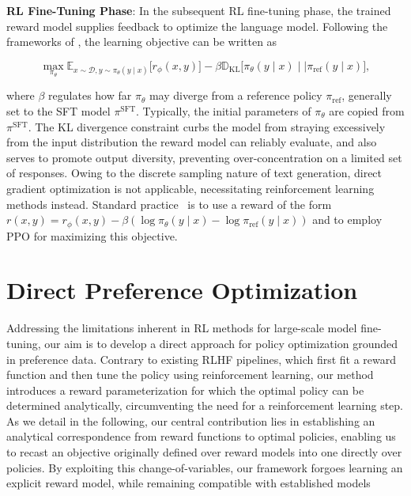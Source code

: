 \textbf{RL Fine-Tuning Phase}: In the subsequent RL fine-tuning phase, the trained reward model supplies feedback to optimize the language model. Following the frameworks of \citet{jaques2017sequence, jaques2020human}, the learning objective can be written as

\begin{equation}\label{eq:RL}
\max_{\pi_{\theta}}  \mathbb{E}_{x\sim \mathcal{D}, y\sim \pi_{\theta}(y \mid x)}\bigl[r_{\phi}(x, y)\bigr] - \beta\mathbb{D}_{\textrm{KL}}\bigl[\pi_{\theta}(y\mid x)\mid \mid \pi_\text{ref}(y\mid x)\bigr],
\end{equation}

where $\beta$ regulates how far $\pi_\theta$ may diverge from a reference policy $\pi_\text{ref}$, generally set to the SFT model $\pi^\text{SFT}$. Typically, the initial parameters of $\pi_\theta$ are copied from $\pi^\text{SFT}$. The KL divergence constraint curbs the model from straying excessively from the input distribution the reward model can reliably evaluate, and also serves to promote output diversity, preventing over-concentration on a limited set of responses. Owing to the discrete sampling nature of text generation, direct gradient optimization is not applicable, necessitating reinforcement learning methods instead. Standard practice~\cite{ziegler2020finetuning, stiennon2022learning, bai2022training, ouyang2022training} is to use a reward of the form ${r(x, y) = r_{\phi}(x, y) -\beta (\log \pi_{\theta}(y\mid x) - \log \pi_\text{ref}(y\mid x))}$ and to employ PPO \cite{schulman2017proximal} for maximizing this objective.

\section{Direct Preference Optimization}\label{sec:DPO}

Addressing the limitations inherent in RL methods for large-scale model fine-tuning, our aim is to develop a direct approach for policy optimization grounded in preference data. Contrary to existing RLHF pipelines, which first fit a reward function and then tune the policy using reinforcement learning, our method introduces a reward parameterization for which the optimal policy can be determined analytically, circumventing the need for a reinforcement learning step. As we detail in the following, our central contribution lies in establishing an analytical correspondence from reward functions to optimal policies, enabling us to recast an objective originally defined over reward models into one directly over policies. By exploiting this change-of-variables, our framework forgoes learning an explicit reward model, while remaining compatible with established models


